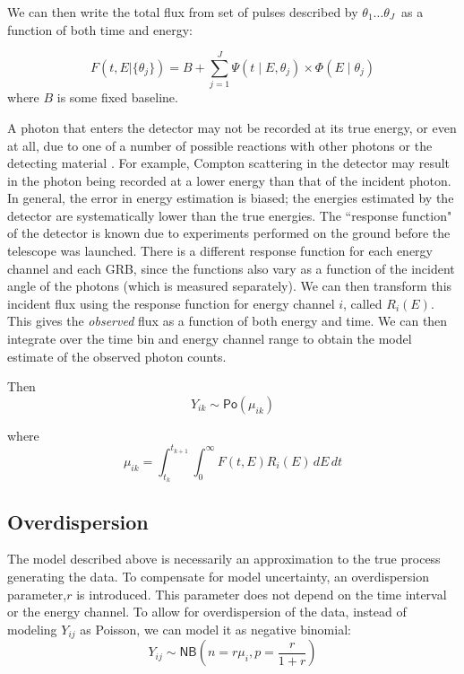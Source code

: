 \documentclass[iop,onecolumn]{emulateapj}
\newcommand{\Po}{\mathsf{Po}}\newcommand{\Un}{\mathsf{Un}}
\newcommand{\NB}{\mathsf{NB}}
\begin{document}
We can then write the total flux from set of pulses described by $\theta_1 \dots \theta_J$\ as a function of both time and energy:

\begin{equation} F(t,E| \{\theta_j\} ) = B + \sum_{j = 1}^J \Psi(t \mid E, \theta_j) \times \Phi(E \mid \theta_j) \end{equation}
where $B$ is some fixed baseline. 

A photon that enters the detector may not be recorded at its true energy, or even at all, due to one of a number of possible reactions with other photons or the detecting material \citet{Lore:Epst:1989}. For example, Compton scattering in the detector may result in the photon being recorded at a lower energy than that of the incident photon. In general, the error in energy estimation is biased; the energies estimated by the detector are systematically lower than the true energies.    The ``response function" of the detector is known due to experiments performed on the ground before the telescope was launched. There is a different response function for each energy channel and each GRB, since the functions also vary as a function of the incident angle of the photons (which is measured separately). We can then transform this incident flux using the response function for  energy channel $i$, called $R_i(E)$. This gives the \emph{observed} flux as a function of both energy and time. We can then integrate over the time bin and energy channel range to obtain the model estimate of the observed photon counts.

Then \[Y_{ik} \sim \Po(\mu_{ik}) \]

where \[\mu_{ik} = \int_{t_{k}}^{t_{k+1}} \int_0^{\infty} F(t,E) R_i(E) \,dE \,dt \]



        
\subsection{Overdispersion}
The model described above is necessarily an approximation to the true process generating the data.  To compensate for model uncertainty, an overdispersion parameter,$r$ is introduced. This parameter does not depend on the time interval or the energy channel. To allow for overdispersion of the data, instead of modeling $Y_{ij}$ as Poisson, we can model it as negative binomial:
\[ Y_{ij} \sim \NB \left(n = r\mu_i , p = \frac{r}{1+r} \right)\]
\end{document}
